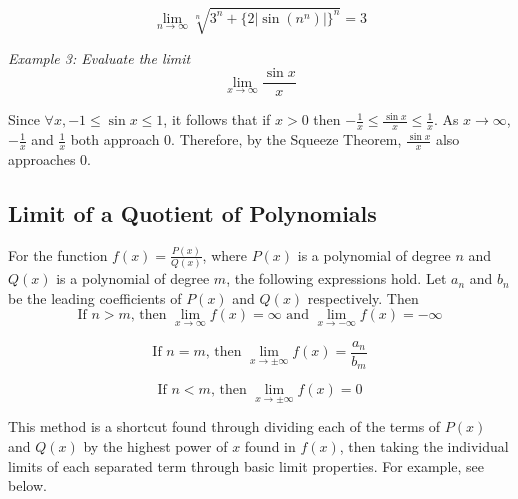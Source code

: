\documentclass{article}
\begin{document}
            \begin{equation*}
                \lim_{n\to\infty} \sqrt[n]{3^n+\{2|\sin{(n^n)}|\}^n} = 3
            \end{equation*}

            \noindent \color{blue} \textit{Example 3: Evaluate the limit} \\
            \begin{equation*}
                \lim_{x\to\infty}\frac{\sin{x}}{x}
            \end{equation*} \color{black}

            \noindent Since $\forall x,-1\leq\sin{x}\leq1$, it follows that if $x>0$ then
            $-\frac{1}{x}\leq\frac{\sin{x}}{x}\leq\frac{1}{x}$. As $x\rightarrow\infty$,
            $-\frac{1}{x}$ and $\frac{1}{x}$ both approach 0. Therefore, by the Squeeze Theorem,
            $\frac{\sin{x}}{x}$ also approaches 0. \\


        \subsection{Limit of a Quotient of Polynomials}
            For the function $f(x)=\frac{P(x)}{Q(x)}$, where $P(x)$ is a polynomial of degree $n$
            and $Q(x)$ is a polynomial of degree $m$, the following expressions hold. Let $a_n$
            and $b_n$ be the leading coefficients of $P(x)$ and $Q(x)$ respectively. Then \\

            \begin{equation*}
                \text{If $n>m$, then }\lim_{x\to\infty}f(x)=\infty\text{ and }
                \lim_{x\to-\infty}f(x)=-\infty
            \end{equation*}

            \begin{equation*}
                \text{If $n=m$, then }\lim_{x\to\pm\infty}f(x)=\frac{a_n}{b_m}
            \end{equation*}

            \begin{equation*}
                \text{If $n<m$, then }\lim_{x\to\pm\infty}f(x)=0
            \end{equation*}

            \noindent This method is a shortcut found through dividing each of the terms of $P(x)$
            and $Q(x)$ by the highest power of $x$ found in $f(x)$, then taking the individual limits
            of each separated term through basic limit properties. For example, see below. \\
\end{document}
